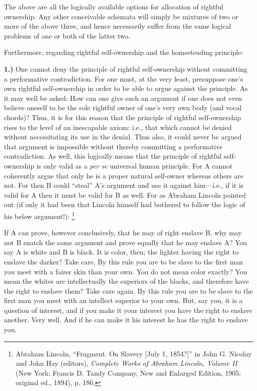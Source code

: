 \documentclass[letterpaper,12pt]{article}
\newenvironment{squote}
  {\quote\small}
  {\endquote}
\begin{document}
The above are all the logically available options for allocation of rightful ownership. Any other conceivable schemata will simply be mixtures of two or more of the above three, and hence necessarily suffer from the same logical problems of one or both of the latter two.

Furthermore, regarding rightful self-ownership and the homesteading principle:

\textbf{1.)} One cannot deny the principle of rightful self-ownership without committing a performative contradiction. For one must, at the very least, presuppose one's own rightful self-ownership in order to be able to argue against the principle. As it may well be asked: How can one give such an argument if one does not even believe oneself to be the sole rightful owner of one's very own body (and vocal chords)? Thus, it is for this reason that the principle of rightful self-ownership rises to the level of an inescapable axiom: i.e., that which cannot be denied without necessitating its use in the denial. Thus also, it could never be argued that argument is impossible without thereby committing a performative contradiction. As well, this logically means that the principle of rightful self-ownership is only valid as a \emph{per se} universal human principle. For A cannot coherently argue that only he is a proper natural self-owner whereas others are not. For then B could ``steal'' A's argument and use it against him---i.e., if it is valid for A then it must be valid for B as well. For as Abraham Lincoln pointed out (if only it had been that Lincoln himself had bothered to follow the logic of his below argument!): \footnote{Abraham Lincoln, ``Fragment. On Slavery [July 1, 1854?]'' in John G. Nicolay and John Hay (editors), \emph{Complete Works of Abraham Lincoln, Volume II} (New York: Francis D. Tandy Company, New and Enlarged Edition, 1905; original ed., 1894), p. 186.}

\begin{squote}
If A can prove, however conclusively, that he may of right enslave B, why may not B snatch the same argument and prove equally that he may enslave A? You say A is white and B is black. It is color, then; the lighter having the right to enslave the darker? Take care. By this rule you are to be slave to the first man you meet with a fairer skin than your own. You do not mean color exactly? You mean the whites are intellectually the superiors of the blacks, and therefore have the right to enslave them? Take care again. By this rule you are to be slave to the first man you meet with an intellect superior to your own. But, say you, it is a question of interest, and if you make it your interest you have the right to enslave another. Very well. And if he can make it his interest he has the right to enslave you.
\end{squote}
\end{document}
